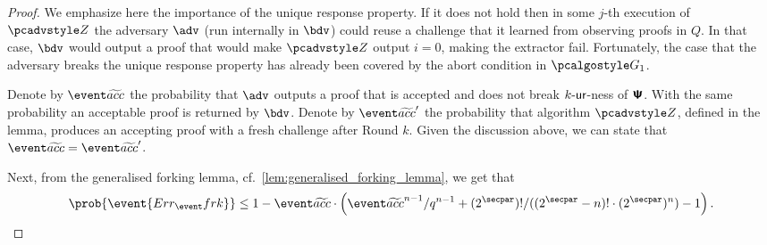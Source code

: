 \documentclass[runningheads,11pt]{llncs}
\begin{document}
\begin{proof}
{We emphasize here the importance of the unique response property. If it does not hold then in
some $j$-th execution of $\zdv$ the adversary $\adv$ (run internally in $\bdv$) could reuse a
challenge that it learned from observing proofs in $Q$. In that case, $\bdv$ would output a
proof that would make $\zdv$ output $i = 0$, making the extractor fail. Fortunately, the case
that the adversary breaks the unique response property has already been covered by the abort
condition in $\game{1}$.

Denote by $\waccProb$ the probability that $\advse$ outputs a proof that is accepted and does
not break ${k\text{-}\mathsf{ur}}$-ness of $\bm{\mathsf{\Psi}}$. With the same probability an acceptable proof is returned by
$\bdv$. Denote by $\waccProb'$ the probability that algorithm $\zdv$, defined in the lemma,
produces an accepting proof with a fresh challenge after Round $k$. Given the discussion above,
we can state that $\waccProb = \waccProb'$.

Next, from the generalised forking lemma, cf.~\cref{lem:generalised_forking_lemma}, we get that
\begin{equation}
  \begin{split}
    \prob{\event{\errfrk}} \leq 1 - \waccProb \cdot \left(\infrac{\waccProb^{n -
          1}}{q^{n - 1}} + \infrac{(2^\secpar) !}{((2^\secpar - n)! \cdot
        (2^\secpar)^{n})} - 1\right).
\end{split}
\end{equation}

}


\end{proof}
\end{document}
